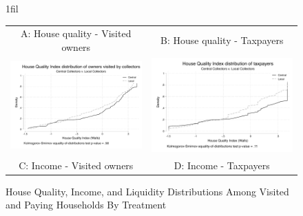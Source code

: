 \documentclass[12pt,english]{article}
\makeatletter
\newcommand*{\centerfloat}{%
  \parindent \z@
  \leftskip \z@ \@plus 1fil \@minus \textwidth
  \rightskip\leftskip
  \parfillskip \z@skip}
\makeatother
\begin{document}
\begin{figure}[H]
\centering{}\caption{House Quality, Income, and Liquidity Distributions Among Visited and Paying Households By Treatment
\label{fig:distribution_all}}
\centerfloat
\begin{tabular}{cc}
A: House quality - Visited owners & B: House quality - Taxpayers  \\
\includegraphics[scale=.55]{Output/dist_housequal_visited.pdf} & \includegraphics[scale=.55]{Output/dist_housequal_taxpayers.pdf}\\
C: Income - Visited owners & D: Income - Taxpayers  \\

\end{tabular}
\end{figure}
\end{document}
